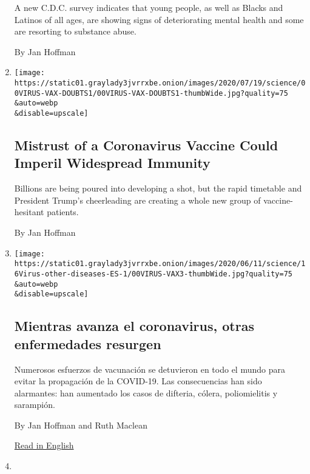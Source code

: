 \begin{enumerate}
  A new C.D.C. survey indicates that young people, as well as Blacks and
  Latinos of all ages, are showing signs of deteriorating mental health
  and some are resorting to substance abuse.

  By Jan Hoffman
\item
  \href{/2020/07/18/health/coronavirus-anti-vaccine.html}{}

  \texttt{[image: https://static01.graylady3jvrrxbe.onion/images/2020/07/19/science/00VIRUS-VAX-DOUBTS1/00VIRUS-VAX-DOUBTS1-thumbWide.jpg?quality=75\\\&auto=webp\\\&disable=upscale]}

  \hypertarget{mistrust-of-a-coronavirus-vaccine-could-imperil-widespread-immunity}{%
  \subsection{Mistrust of a Coronavirus Vaccine Could Imperil Widespread
  Immunity}\label{mistrust-of-a-coronavirus-vaccine-could-imperil-widespread-immunity}}

  Billions are being poured into developing a shot, but the rapid
  timetable and President Trump's cheerleading are creating a whole new
  group of vaccine-hesitant patients.

  By Jan Hoffman
\item
  \href{/es/2020/06/16/espanol/mundo/coronavirus-sarampion.html}{}

  \texttt{[image: https://static01.graylady3jvrrxbe.onion/images/2020/06/11/science/16Virus-other-diseases-ES-1/00VIRUS-VAX3-thumbWide.jpg?quality=75\\\&auto=webp\\\&disable=upscale]}

  \hypertarget{mientras-avanza-el-coronavirus-otras-enfermedades-resurgen}{%
  \subsection{Mientras avanza el coronavirus, otras enfermedades
  resurgen}\label{mientras-avanza-el-coronavirus-otras-enfermedades-resurgen}}

  Numerosos esfuerzos de vacunación se detuvieron en todo el mundo para
  evitar la propagación de la COVID-19. Las consecuencias han sido
  alarmantes: han aumentado los casos de difteria, cólera, poliomielitis
  y sarampión.

  By Jan Hoffman and Ruth Maclean

  \href{https://www.nytimes3xbfgragh.onion/2020/06/14/health/coronavirus-vaccines-measles.html}{Read
  in English}
\item
  \href{/2020/06/14/health/coronavirus-vaccines-measles.html}{}


\end{enumerate}
